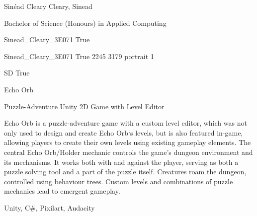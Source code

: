 
\begingroup{}\relax



\def\Key{Sinead_Cleary_3E071}

{Sinéad Cleary}
{Cleary, Sinead}

{Bachelor of Science (Honours) in Applied Computing}

{Sinead_Cleary_3E071}
{True}

{Sinead_Cleary_3E071}
{True}
{2245}
{3179}
{portrait}
{1}

{SD}
{True}

{Echo Orb}

{Puzzle-Adventure Unity 2D Game with Level Editor}

{Echo Orb is a puzzle-adventure game with a custom level editor, which was not only used to design and create Echo Orb\textquoteleft{}s levels, but is also featured in-game, allowing players to create their own levels using existing gameplay elements. The central Echo Orb/Holder mechanic controls the game\textquoteright{}s dungeon environment and its mechanisms. It works both with and against the player, serving as both a puzzle solving tool and a part of the puzzle itself. Creatures roam the dungeon, controlled using behaviour trees. Custom levels and combinations of puzzle mechanics lead to emergent gameplay.}

{Unity, C\#, Pixilart, Audacity}

